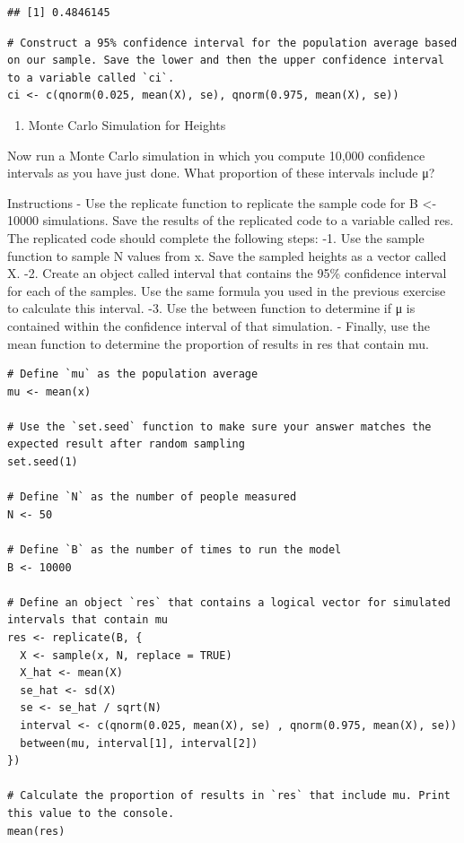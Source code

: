 \documentclass[
]{article}
\providecommand{\tightlist}{%
  \setlength{\itemsep}{0pt}\setlength{\parskip}{0pt}}
\begin{document}
\begin{verbatim}
## [1] 0.4846145
\end{verbatim}

\begin{verbatim}
# Construct a 95% confidence interval for the population average based on our sample. Save the lower and then the upper confidence interval to a variable called `ci`.
ci <- c(qnorm(0.025, mean(X), se), qnorm(0.975, mean(X), se))
\end{verbatim}

\begin{enumerate}
\def\labelenumi{\arabic{enumi}.}
\setcounter{enumi}{4}
\tightlist
\item
  Monte Carlo Simulation for Heights
\end{enumerate}

Now run a Monte Carlo simulation in which you compute 10,000 confidence
intervals as you have just done. What proportion of these intervals
include μ?

Instructions - Use the replicate function to replicate the sample code
for B \textless- 10000 simulations. Save the results of the replicated
code to a variable called res. The replicated code should complete the
following steps: -1. Use the sample function to sample N values from x.
Save the sampled heights as a vector called X. -2. Create an object
called interval that contains the 95\% confidence interval for each of
the samples. Use the same formula you used in the previous exercise to
calculate this interval. -3. Use the between function to determine if μ
is contained within the confidence interval of that simulation. -
Finally, use the mean function to determine the proportion of results in
res that contain mu.

\begin{verbatim}
# Define `mu` as the population average
mu <- mean(x)

# Use the `set.seed` function to make sure your answer matches the expected result after random sampling
set.seed(1)

# Define `N` as the number of people measured
N <- 50

# Define `B` as the number of times to run the model
B <- 10000

# Define an object `res` that contains a logical vector for simulated intervals that contain mu
res <- replicate(B, {
  X <- sample(x, N, replace = TRUE)
  X_hat <- mean(X)
  se_hat <- sd(X)
  se <- se_hat / sqrt(N)
  interval <- c(qnorm(0.025, mean(X), se) , qnorm(0.975, mean(X), se))
  between(mu, interval[1], interval[2])
})

# Calculate the proportion of results in `res` that include mu. Print this value to the console.
mean(res)
\end{verbatim}
\end{document}
